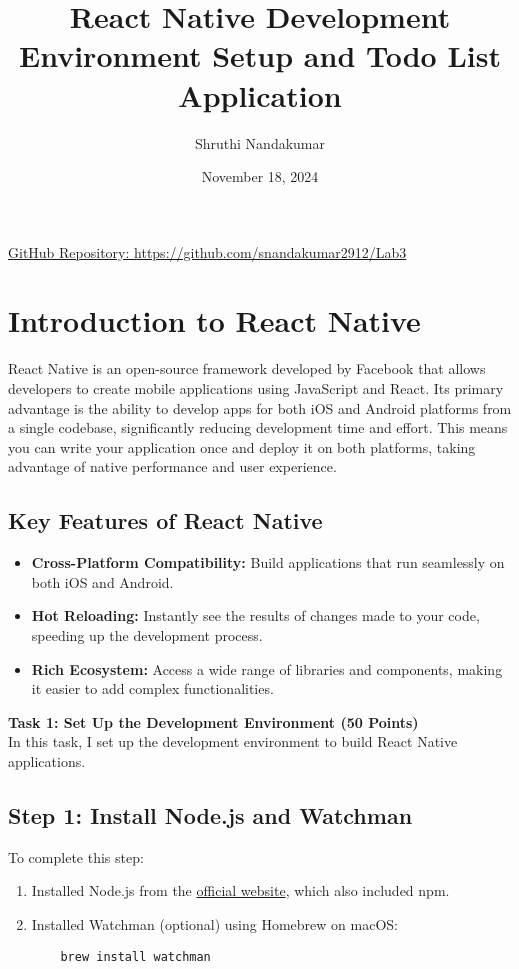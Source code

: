 \documentclass{article}
\title{React Native Development Environment Setup and Todo List Application}
\author{Shruthi Nandakumar}
\date{November 18, 2024}
\begin{document}
\maketitle

\begin{center}
\href{https://github.com/snandakumar2912/Lab3}{GitHub Repository: https://github.com/snandakumar2912/Lab3}
\end{center}

\section{Introduction to React Native}
React Native is an open-source framework developed by Facebook that allows developers to create mobile applications using JavaScript and React. Its primary advantage is the ability to develop apps for both iOS and Android platforms from a single codebase, significantly reducing development time and effort. This means you can write your application once and deploy it on both platforms, taking advantage of native performance and user experience.

\subsection{Key Features of React Native}
\begin{itemize}
    \item \textbf{Cross-Platform Compatibility:} Build applications that run seamlessly on both iOS and Android.
    \item \textbf{Hot Reloading:} Instantly see the results of changes made to your code, speeding up the development process.
    \item \textbf{Rich Ecosystem:} Access a wide range of libraries and components, making it easier to add complex functionalities.
\end{itemize}


\noindent\textbf{\Large Task 1: Set Up the Development Environment (50 Points)}\\[0.5cm]
\noindent In this task, I set up the development environment to build React Native applications.\\[1cm]

\subsection{Step 1: Install Node.js and Watchman}
To complete this step:
\begin{enumerate}
    \item Installed Node.js from the \href{https://nodejs.org/en}{official website}, which also included npm.
    \item Installed Watchman (optional) using Homebrew on macOS:
    \begin{verbatim}
    brew install watchman
    \end{verbatim}
\end{enumerate}
\end{document}
